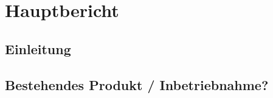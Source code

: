 \documentclass[12pt, a4paper]{report}
\begin{document}
	
	
		
	
	\tableofcontents
	\newpage
	
	
	
	\part{Hauptbericht}
	
	\chapter{Einleitung}
	
	
	
	
	
	
	\chapter{Bestehendes Produkt / Inbetriebnahme?}
	
	
\end{document}
